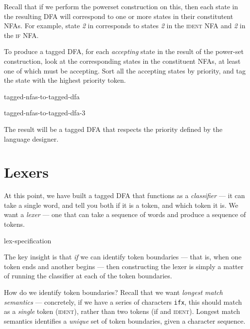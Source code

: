Recall that if we perform the powerset construction on this, then each state in the resulting DFA will correspond to one or more states in their constitutent NFAs. For example, state \emph{2} in  corresponds to states \emph{2} in the \textsc{ident} NFA and \emph{2} in the \textsc{if} NFA.

To produce a tagged DFA, for each \emph{accepting} state in the result of the power-set construction, look at the corresponding states in the constituent NFAs, at least one of which must be accepting. Sort all the accepting states by priority, and tag the state with the highest priority token.

\begin{minipage}[t]{0.5\textwidth}
    \begin{center}
    {tagged-nfas-to-tagged-dfa}
    \end{center}
\end{minipage}%
\begin{minipage}[t]{0.5\textwidth}
    \begin{center}
    {tagged-nfas-to-tagged-dfa-3}
    \end{center}
\end{minipage}

The result will be a tagged DFA that respects the priority defined by the language designer.

\section{Lexers}
At this point, we have built a tagged DFA that functions as a \emph{classifier} --- it can take a single word, and tell you both if it is a token, and which token it is. We want a \emph{lexer} --- one that can take a sequence of words and produce a sequence of tokens. 

\begin{center}
{lex-specification}
\end{center}

The key insight is that \emph{if} we can identify token boundaries --- that is, when one token ends and another begins --- then constructing the lexer is simply a matter of running the classifier at each of the token boundaries.

How do we identify token boundaries? Recall that we want \emph{longest match semantics} --- concretely, if we have a series of characters \texttt{ifx}, this should match as a \emph{single} token (\textsc{ident}), rather than two tokens (\textsf{if} and \textsc{ident}). Longest match semantics identifies a \emph{unique} set of token boundaries, given a character sequence. 

